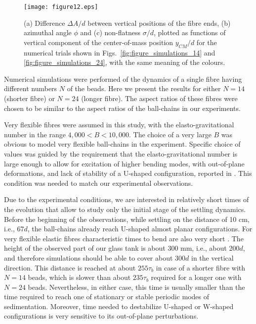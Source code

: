 \documentclass{article}
\begin{document}
\begin{figure}[ht!]
    \centering
    \texttt{[image: figure12.eps]}
    \vspace{-.5cm}
    \caption{
    (a) Difference $\Delta A/d$ between vertical positions of the fibre ends, %
    (b) azimuthal angle $\phi$ %
    and
    (c) %
    non-flatness $\sigma/d$, plotted  %
    as functions of vertical component of the center-of-mass position  $y_{CM}/d$ %
    for the numerical trials shown in Figs.~\ref{fig:figure_simulations_14} and 
    \ref{fig:figure_simulations_24}, with the same meaning of the colours.
    }
    \label{fig:figure_simulations_auxplot}
\end{figure}

Numerical simulations were performed of the dynamics of a single fibre having different numbers $N$ of the beads. Here we present the results for either $N=14$ (shorter fibre) or $N=24$ (longer fibre). The aspect ratios of these fibres were chosen to be similar to the aspect ratios of the ball-chains in our experiments. 

Very flexible fibres were assumed in this study, with the elasto-gravitational number 
in the range $4,000<B<10,000$.
The choice of a very large $B$ was obvious to model %
very flexible ball-chains in the experiment. Specific choice of values was guided by the requirement that 
the elasto-gravitational number is large enough to allow for %
excitation of higher bending modes, with out-of-plane deformations, and lack of stability of a U-shaped configuration, reported in \cite{lagomarsino2005hydrodynamic,saggiorato2015conformations}. This condition was needed  to match our experimental observations.  

Due to the experimental conditions, we are interested in relatively short times of the evolution that allow to study only the initial stage of the settling dynamics. Before the beginning of the observations, while settling on the distance of 10 cm, i.e., 67$d$, the ball-chains already reach U-shaped almost planar configurations. For very flexible elastic fibres characteristic times to bend are also very short \cite{lagomarsino2005hydrodynamic}. The height of the observed part of our %
glass tank is about 300 mm, i.e., about 200$d$, %
and therefore simulations should be able to 
cover about $300 d$ in the vertical direction. This distance is reached at about $255 \tau_{b}$ in case of a shorter fibre with $N=14$ beads, which is slower than about $235 \tau_{b}$ required for a longer one with $N=24$ beads.
Nevertheless, in either case, this time is usually smaller than the time required to %
reach 
one of stationary or stable periodic  %
modes of sedimentation. Moreover, time needed to destabilize U-shaped or W-shaped configurations is very sensitive to its out-of-plane perturbations. %
\end{document}
